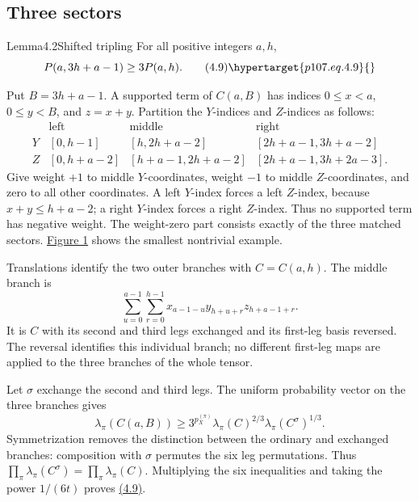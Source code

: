 \subsection{Three sectors}\hypertarget{p107.sec.4.2}{}
\begin{result}{Lemma}{4.2}{Shifted tripling}
For all positive integers $a,h$,
\begin{equation}
P(a,3h+a-1)\ge3P(a,h).\tag{4.9}\hypertarget{p107.eq.4.9}{}
\end{equation}
\end{result}
\begin{amsthmproof}
Put $B=3h+a-1$. A supported term of $C(a,B)$ has indices $0\le x<a$, $0\le y<B$, and $z=x+y$. Partition the $Y$-indices and $Z$-indices as follows:
\[
\begin{array}{c|ccc}
 & \text{left} & \text{middle} & \text{right}\\\hline
Y & [0,h-1] & [h,2h+a-2] & [2h+a-1,3h+a-2]\\
Z & [0,h+a-2] & [h+a-1,2h+a-2] & [2h+a-1,3h+2a-3].
\end{array}
\]
Give weight $+1$ to middle $Y$-coordinates, weight $-1$ to middle $Z$-coordinates, and zero to all other coordinates. A left $Y$-index forces a left $Z$-index, because $x+y\le h+a-2$; a right $Y$-index forces a right $Z$-index. Thus no supported term has negative weight. The weight-zero part consists exactly of the three matched sectors. \hyperlink{p107.figure.1}{Figure 1} shows the smallest nontrivial example.

Translations identify the two outer branches with $C=C(a,h)$. The middle branch is
\[
\sum_{u=0}^{a-1}\sum_{r=0}^{h-1}x_{a-1-u}y_{h+u+r}z_{h+a-1+r}.
\]
It is $C$ with its second and third legs exchanged and its first-leg basis reversed. The reversal identifies this individual branch; no different first-leg maps are applied to the three branches of the whole tensor.

Let $\sigma$ exchange the second and third legs. The uniform probability vector on the three branches gives
\[
\lambda_\pi(C(a,B))\ge3^{p_X^{(\pi)}}\lambda_\pi(C)^{2/3}\lambda_\pi(C^\sigma)^{1/3}.
\]
Symmetrization removes the distinction between the ordinary and exchanged branches: composition with $\sigma$ permutes the six leg permutations. Thus $\prod_\pi\lambda_\pi(C^\sigma)=\prod_\pi\lambda_\pi(C)$. Multiplying the six inequalities and taking the power $1/(6t)$ proves \hyperlink{p107.eq.4.9}{(4.9)}.
\end{amsthmproof}
